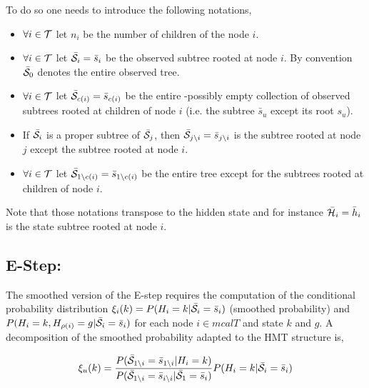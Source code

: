 \documentclass[a4paper,11pt]{report}
\begin{document}
{    To do so one needs to introduce the following notations,
    \begin{itemize}
			\item $\forall i \in \mathcal{T}$ let $n_{i}$ be the number of children of the node $i$.
      \item $\forall i \in \mathcal{T}$ let $\bar{\mathcal{S}}_{i}= \bar{s}_{i}$ be the observed subtree rooted at node $i$. By convention $\bar{\mathcal{S}}_{0}$ denotes the entire observed tree.
      \item $\forall i \in \mathcal{T}$ let $\bar{\mathcal{S}}_{c(i)}= \bar{s}_{c(i)}$ be the entire -possibly empty collection of observed subtrees rooted at children of node $i$ (i.e. the subtree $\bar{s}_{u}$ except its root $s_{u}$).
      \item If $\bar{\mathcal{S}}_{i}$ is a proper subtree of $\bar{\mathcal{S}}_{j}$, then $\bar{\mathcal{S}}_{j\backslash i} = \bar{s}_{j\backslash i}$ is the subtree rooted at node $j$ except the subtree rooted at node $i$.
      \item $\forall i \in \mathcal{T}$ let $\bar{\mathcal{S}}_{1\backslash c(i)}= \bar{s}_{1\backslash c(i)}$ be the entire tree except for the subtrees rooted at children of node $i$.
    \end{itemize}
    Note that those notations transpose to the hidden state and for instance $\bar{\mathcal{H}}_{i}= \bar{h}_{i}$ is the state subtree rooted at node $i$.\\
    
    \subsection{E-Step:}
			\label{subseq:SHMT/Learning/E}
			The smoothed version of the E-step requires the computation of the conditional probability distribution $\xi_{i}(k) = P(H_{i}=k | \bar{\mathcal{S}}_{i}= \bar{s}_{i})$ (smoothed probability) and $P(H_{i}=k, H_{\rho(i)}=g | \bar{\mathcal{S}}_{i}= \bar{s}_{i})$ for each node $i \in mcalT$ and state $k$ and $g$. A decomposition of the smoothed probability adapted to the HMT structure is,
			
			\begin{equation}
			  \xi_{u}(k) = 
					\frac{P(\bar{\mathcal{S}}_{1\backslash i}= \bar{s}_{1\backslash i} | H_{i}=k)}
						{P(\bar{\mathcal{S}}_{1\backslash i}= \bar{s}_{i\backslash i} | \bar{\mathcal{S}}_{1}= \bar{s}_{i})} 
					P(H_{i}= k |\bar{\mathcal{S}}_{i}= \bar{s}_{i})
				\label{eq:Smoothed P decomposition}
			\end{equation}
			
}
\end{document}
